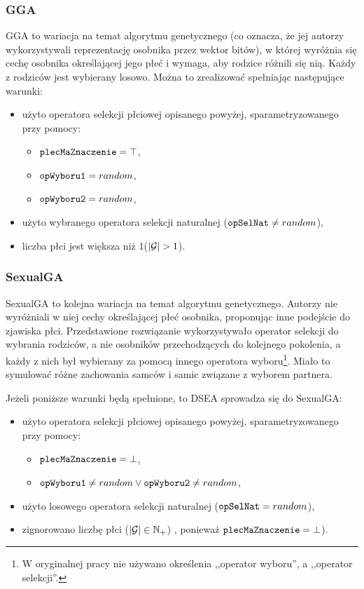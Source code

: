 \documentclass[./FM_mgr.tex]{subfiles}
\begin{document}
\subsubsection{GGA}

GGA \cite{GGA} to wariacja na temat algorytmu genetycznego (co oznacza, że jej autorzy wykorzystywali reprezentację osobnika przez wektor bitów), w której wyróżnia się cechę osobnika określającej jego płeć i wymaga, aby rodzice różnili się nią. Każdy z rodziców jest wybierany losowo. Można to zrealizować spełniając następujące warunki:
\begin{itemize}
	\item użyto operatora selekcji płciowej opisanego powyżej, sparametryzowanego przy pomocy:
	\begin{itemize}
		\item $\mathtt{plecMaZnaczenie} = \top$,
		\item $\mathtt{opWyboru1} = random$,
		\item $\mathtt{opWyboru2} = random$,
	\end{itemize}
	\item użyto wybranego operatora selekcji naturalnej ($\mathtt{opSelNat} \neq random$),
	\item liczba płci jest większa niż 1($|\mathcal{G}| > 1$).
\end{itemize}

\subsubsection{SexualGA}

SexualGA \cite{SexualGA} to kolejna wariacja na temat algorytmu genetycznego. Autorzy nie wyróżniali w niej cechy określającej płeć osobnika, proponując inne podejście do zjawiska płci. Przedstawione rozwiązanie wykorzystywało operator selekcji do wybrania rodziców, a nie osobników przechodzących do kolejnego pokolenia, a każdy z nich był wybierany za pomocą innego operatora wyboru\footnote{
	W oryginalnej pracy nie używano określenia ,,operator wyboru'', a ,,operator selekcji''.
}. Miało to symulować różne zachowania samców i samic związane z wyborem partnera.

Jeżeli poniższe warunki będą spełnione, to DSEA sprowadza się do SexualGA:
\begin{itemize}
	\item użyto operatora selekcji płciowej opisanego powyżej, sparametryzowanego przy pomocy:
	\begin{itemize}
		\item $\mathtt{plecMaZnaczenie} = \bot$,
		\item $\mathtt{opWyboru1} \neq random \vee \mathtt{opWyboru2} \neq random$,
	\end{itemize}
	\item użyto losowego operatora selekcji naturalnej ($\mathtt{opSelNat} = random$),
	\item zignorowano liczbę płci ($|\mathcal{G}| \in \mathbb{N}_{+}$) , ponieważ $\mathtt{plecMaZnaczenie} = \bot$).
\end{itemize}
\end{document}
